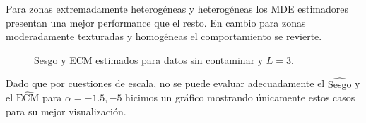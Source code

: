  Para zonas extremadamente heterogéneas y heterogéneas los MDE estimadores presentan una mejor performance que el resto. En cambio para zonas moderadamente texturadas y homogéneas el comportamiento se revierte.


\begin{figure}[H]
	\caption{\label{SesgoyECMSinContL=3}\small Sesgo y ECM estimados para datos sin contaminar y $ L=3$.}
\end{figure}

Dado que por cuestiones de escala, no se puede evaluar adecuadamente el $\widehat{\text{Sesgo}}$ y el $\widehat{\text{ECM}}$ para $\alpha=-1.5, -5$ hicimos un gráfico mostrando únicamente estos casos para su mejor visualización.

